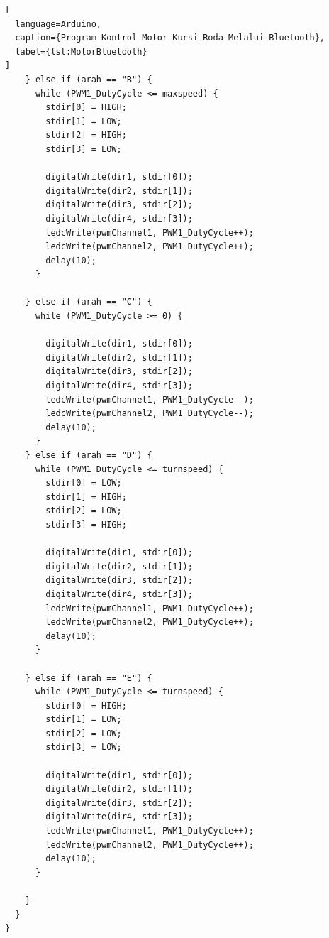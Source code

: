 \begin{lstlisting}[
  language=Arduino,
  caption={Program Kontrol Motor Kursi Roda Melalui Bluetooth},
  label={lst:MotorBluetooth}
]
    } else if (arah == "B") {
      while (PWM1_DutyCycle <= maxspeed) {
        stdir[0] = HIGH;
        stdir[1] = LOW;
        stdir[2] = HIGH;
        stdir[3] = LOW;

        digitalWrite(dir1, stdir[0]);
        digitalWrite(dir2, stdir[1]);
        digitalWrite(dir3, stdir[2]);
        digitalWrite(dir4, stdir[3]);
        ledcWrite(pwmChannel1, PWM1_DutyCycle++);
        ledcWrite(pwmChannel2, PWM1_DutyCycle++);
        delay(10);
      }

    } else if (arah == "C") {
      while (PWM1_DutyCycle >= 0) {

        digitalWrite(dir1, stdir[0]);
        digitalWrite(dir2, stdir[1]);
        digitalWrite(dir3, stdir[2]);
        digitalWrite(dir4, stdir[3]);
        ledcWrite(pwmChannel1, PWM1_DutyCycle--);
        ledcWrite(pwmChannel2, PWM1_DutyCycle--);
        delay(10);
      }
    } else if (arah == "D") {
      while (PWM1_DutyCycle <= turnspeed) {
        stdir[0] = LOW;
        stdir[1] = HIGH;
        stdir[2] = LOW;
        stdir[3] = HIGH;

        digitalWrite(dir1, stdir[0]);
        digitalWrite(dir2, stdir[1]);
        digitalWrite(dir3, stdir[2]);
        digitalWrite(dir4, stdir[3]);
        ledcWrite(pwmChannel1, PWM1_DutyCycle++);
        ledcWrite(pwmChannel2, PWM1_DutyCycle++);
        delay(10);
      }

    } else if (arah == "E") {
      while (PWM1_DutyCycle <= turnspeed) {
        stdir[0] = HIGH;
        stdir[1] = LOW;
        stdir[2] = LOW;
        stdir[3] = LOW;

        digitalWrite(dir1, stdir[0]);
        digitalWrite(dir2, stdir[1]);
        digitalWrite(dir3, stdir[2]);
        digitalWrite(dir4, stdir[3]);
        ledcWrite(pwmChannel1, PWM1_DutyCycle++);
        ledcWrite(pwmChannel2, PWM1_DutyCycle++);
        delay(10);
      }

    }
  }
}  
\end{lstlisting}

